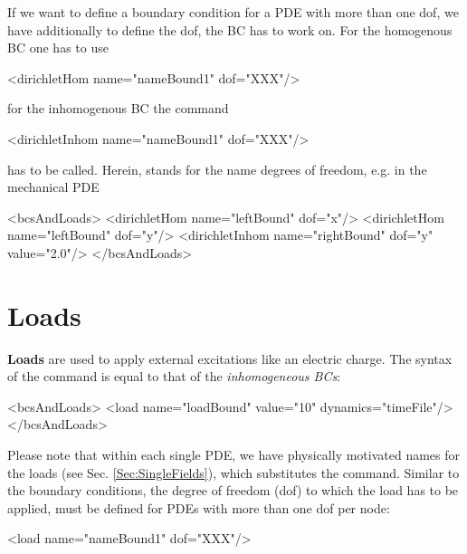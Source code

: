\noindent
If we want to define a boundary condition for a PDE with more
than one dof, we have additionally to define the dof, the BC has to
work on. For the homogenous BC one has to use
\begin{xmllisting}
  <dirichletHom   name="nameBound1" dof="XXX"/>
\end{xmllisting}
\noindent
for the inhomogenous BC the command

\begin{xmllisting}
  <dirichletInhom   name="nameBound1"  dof="XXX"/>
\end{xmllisting}

\noindent
has to be called. Herein,  stands for the name degrees of
freedom, e.g. in the mechanical PDE

\begin{xmllisting}
<bcsAndLoads>
   <dirichletHom   name="leftBound"   dof="x"/>
   <dirichletHom   name="leftBound"   dof="y"/>
   <dirichletInhom name="rightBound"  dof="y"  value="2.0"/>
</bcsAndLoads>
\end{xmllisting}

\section{Loads}
%
{\bf Loads} are used to apply external excitations like an electric
charge.  The syntax of the { } command is equal to that of 
the {\em inhomogeneous BCs}:
\begin{xmllisting}
<bcsAndLoads>
   <load name="loadBound" value="10" dynamics="timeFile"/>
</bcsAndLoads>
\end{xmllisting}
Please note that within each single PDE, we have physically motivated
names for the loads  (see Sec. \ref{Sec:SingleFields}), which
substitutes the  command.
Similar to the boundary conditions, the degree of freedom (dof) to
which the load has to be applied, must be defined for PDEs with more
than one dof per node:

\begin{xmllisting}
  <load  name="nameBound1"  dof="XXX"/>
\end{xmllisting}




